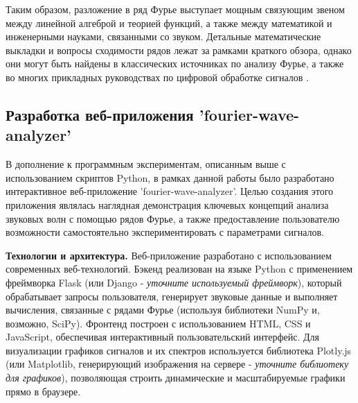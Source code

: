 \documentclass[bachelor, och, diploma]{SCWorks}
\begin{document}
Таким образом, разложение в ряд Фурье выступает мощным связующим звеном между линейной алгеброй и теорией функций, а также между математикой и инженерными науками, связанными со звуком. Детальные математические выкладки и вопросы сходимости рядов лежат за рамками краткого обзора, однако они могут быть найдены в классических источниках по анализу Фурье, а также во многих прикладных руководствах по цифровой обработке сигналов \cite{opp-dsp}.

\subsection{Разработка веб-приложения 'fourier-wave-analyzer'}
\label{sec:webapp}

В дополнение к программным экспериментам, описанным выше с использованием скриптов Python, в рамках данной работы было разработано интерактивное веб-приложение 'fourier-wave-analyzer'. Целью создания этого приложения являлась наглядная демонстрация ключевых концепций анализа звуковых волн с помощью рядов Фурье, а также предоставление пользователю возможности самостоятельно экспериментировать с параметрами сигналов.

\textbf{Технологии и архитектура.} Веб-приложение разработано с использованием современных веб-технологий. Бэкенд реализован на языке Python с применением фреймворка Flask (или Django - \textit{уточните используемый фреймворк}), который обрабатывает запросы пользователя, генерирует звуковые данные и выполняет вычисления, связанные с рядами Фурье (используя библиотеки NumPy и, возможно, SciPy). Фронтенд построен с использованием HTML, CSS и JavaScript, обеспечивая интерактивный пользовательский интерфейс. Для визуализации графиков сигналов и их спектров используется библиотека Plotly.js (или Matplotlib, генерирующий изображения на сервере - \textit{уточните библиотеку для графиков}), позволяющая строить динамические и масштабируемые графики прямо в браузере.
\end{document}
